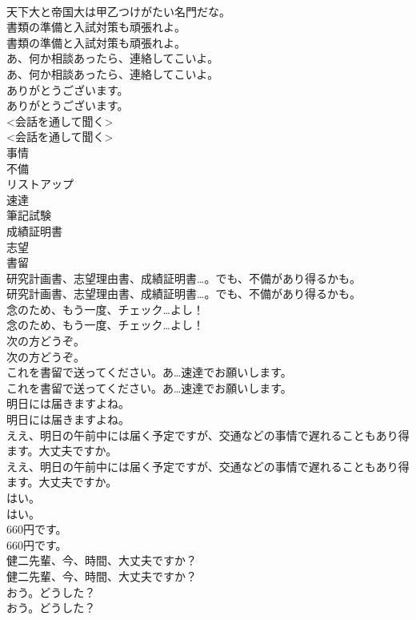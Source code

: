\documentclass[8pt]{extreport}
\begin{document}
\begin{CJK}{UTF8}{min}
\\	天下大と帝国大は甲乙つけがたい名門だな。 
\\	書類の準備と入試対策も頑張れよ。	
\\	書類の準備と入試対策も頑張れよ。 
\\	あ、何か相談あったら、連絡してこいよ。	
\\	あ、何か相談あったら、連絡してこいよ。 
\\	ありがとうございます。	
\\	ありがとうございます。 
\\	<会話を通して聞く>	
\\	<会話を通して聞く> 
\\	事情
\\	不備
\\	リストアップ
\\	速達
\\	筆記試験
\\	成績証明書
\\	志望
\\	書留
\\	研究計画書、志望理由書、成績証明書…。でも、不備があり得るかも。	
\\	研究計画書、志望理由書、成績証明書…。でも、不備があり得るかも。 
\\	念のため、もう一度、チェック…よし！	
\\	念のため、もう一度、チェック…よし！ 
\\	次の方どうぞ。	
\\	次の方どうぞ。 
\\	これを書留で送ってください。あ…速達でお願いします。	
\\	これを書留で送ってください。あ…速達でお願いします。 
\\	明日には届きますよね。	
\\	明日には届きますよね。 
\\	ええ、明日の午前中には届く予定ですが、交通などの事情で遅れることもあり得ます。大丈夫ですか。	
\\	ええ、明日の午前中には届く予定ですが、交通などの事情で遅れることもあり得ます。大丈夫ですか。 
\\	はい。	
\\	はい。 
\\	660円です。	
\\	660円です。 
\\	健二先輩、今、時間、大丈夫ですか？	
\\	健二先輩、今、時間、大丈夫ですか？ 
\\	おう。どうした？	
\\	おう。どうした？ 

\end{CJK}
\end{document}
